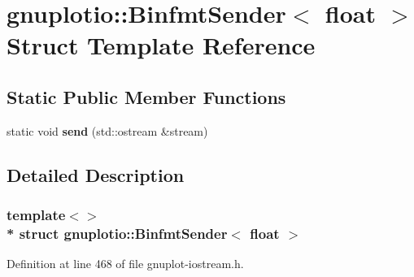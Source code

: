 \hypertarget{structgnuplotio_1_1_binfmt_sender_3_01float_01_4}{}\section{gnuplotio\+:\+:Binfmt\+Sender$<$ float $>$ Struct Template Reference}
\label{structgnuplotio_1_1_binfmt_sender_3_01float_01_4}
\subsection*{Static Public Member Functions}
\begin{DoxyCompactItemize}
\item 
static void {\bfseries send} (std\+::ostream \&stream)\hypertarget{structgnuplotio_1_1_binfmt_sender_3_01float_01_4_ae9c6a1915ee24e54ea5ed1a22c54fee1}{}\label{structgnuplotio_1_1_binfmt_sender_3_01float_01_4_ae9c6a1915ee24e54ea5ed1a22c54fee1}

\end{DoxyCompactItemize}


\subsection{Detailed Description}
\subsubsection*{template$<$$>$\\*
struct gnuplotio\+::\+Binfmt\+Sender$<$ float $>$}



Definition at line 468 of file gnuplot-\/iostream.\+h.

